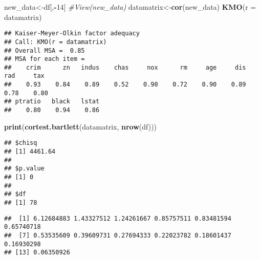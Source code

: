 \documentclass[
]{article}
\newenvironment{Shaded}{\begin{snugshade}}{\end{snugshade}}
\newcommand{\CommentTok}[1]{\textcolor[rgb]{0.56,0.35,0.01}{\textit{#1}}}
\newcommand{\DataTypeTok}[1]{\textcolor[rgb]{0.13,0.29,0.53}{#1}}
\newcommand{\DecValTok}[1]{\textcolor[rgb]{0.00,0.00,0.81}{#1}}
\newcommand{\KeywordTok}[1]{\textcolor[rgb]{0.13,0.29,0.53}{\textbf{#1}}}
\newcommand{\NormalTok}[1]{#1}
\newcommand{\OperatorTok}[1]{\textcolor[rgb]{0.81,0.36,0.00}{\textbf{#1}}}
\begin{document}
\begin{Shaded}
\begin{Highlighting}[]
\NormalTok{new_data<-df[,}\OperatorTok{-}\DecValTok{14}\NormalTok{]}
\CommentTok{#View(new_data)}
\NormalTok{datamatrix<-}\KeywordTok{cor}\NormalTok{(new_data)}
\KeywordTok{KMO}\NormalTok{(}\DataTypeTok{r =}\NormalTok{ datamatrix)}
\end{Highlighting}
\end{Shaded}

\begin{verbatim}
## Kaiser-Meyer-Olkin factor adequacy
## Call: KMO(r = datamatrix)
## Overall MSA =  0.85
## MSA for each item = 
##    crim      zn   indus    chas     nox      rm     age     dis     rad     tax 
##    0.93    0.84    0.89    0.52    0.90    0.72    0.90    0.89    0.78    0.80 
## ptratio   black   lstat 
##    0.80    0.94    0.86
\end{verbatim}

\begin{Shaded}
\begin{Highlighting}[]
\KeywordTok{print}\NormalTok{(}\KeywordTok{cortest.bartlett}\NormalTok{(datamatrix, }\KeywordTok{nrow}\NormalTok{(df)))}
\end{Highlighting}
\end{Shaded}

\begin{verbatim}
## $chisq
## [1] 4461.64
## 
## $p.value
## [1] 0
## 
## $df
## [1] 78
\end{verbatim}

\begin{Shaded}
\end{Shaded}

\begin{verbatim}
##  [1] 6.12684883 1.43327512 1.24261667 0.85757511 0.83481594 0.65740718
##  [7] 0.53535609 0.39609731 0.27694333 0.22023782 0.18601437 0.16930298
## [13] 0.06350926
\end{verbatim}

\begin{Shaded}
\end{Shaded}
\end{document}
